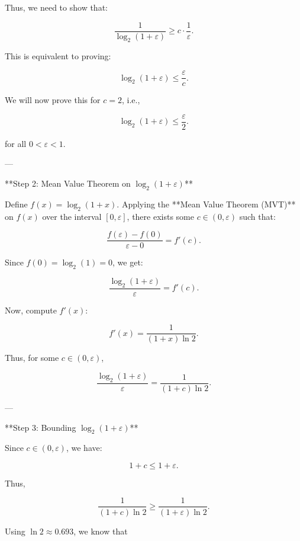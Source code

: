 {       Thus, we need to show that:
       
       \[
       \frac{1}{\log_2(1+\varepsilon)} \geq c \cdot \frac{1}{\varepsilon}.
       \]
       
       This is equivalent to proving:
       
       \[
       \log_2(1+\varepsilon) \leq \frac{\varepsilon}{c}.
       \]
       
       We will now prove this for \( c = 2 \), i.e.,
       
       \[
       \log_2(1+\varepsilon) \leq \frac{\varepsilon}{2}.
       \]
       
       for all \( 0 < \varepsilon < 1 \).
       
       ---
       
         **Step 2: Mean Value Theorem on \( \log_2(1+\varepsilon) \)**
       
       Define \( f(x) = \log_2(1 + x) \). Applying the **Mean Value Theorem (MVT)** on \( f(x) \) over the interval \([0, \varepsilon]\), there exists some \( c \in (0, \varepsilon) \) such that:
       
       \[
       \frac{f(\varepsilon) - f(0)}{\varepsilon - 0} = f'(c).
       \]
       
       Since \( f(0) = \log_2(1) = 0 \), we get:
       
       \[
       \frac{\log_2(1+\varepsilon)}{\varepsilon} = f'(c).
       \]
       
       Now, compute \( f'(x) \):
       
       \[
       f'(x) = \frac{1}{(1+x) \ln 2}.
       \]
       
       Thus, for some \( c \in (0, \varepsilon) \),
       
       \[
       \frac{\log_2(1+\varepsilon)}{\varepsilon} = \frac{1}{(1+c) \ln 2}.
       \]
       
       ---
       
         **Step 3: Bounding \( \log_2(1+\varepsilon) \)**
       
       Since \( c \in (0, \varepsilon) \), we have:
       
       \[
       1 + c \leq 1 + \varepsilon.
       \]
       
       Thus,
       
       \[
       \frac{1}{(1+c) \ln 2} \geq \frac{1}{(1+\varepsilon) \ln 2}.
       \]
       
       Using \( \ln 2 \approx 0.693 \), we know that
       
}
